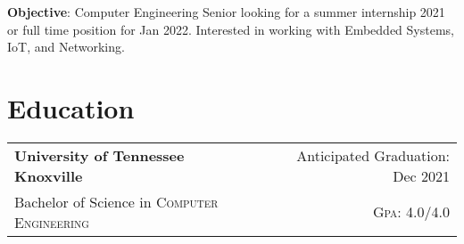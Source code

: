 \documentclass[a4paper,11pt]{article}
\begin{document}

\pagestyle{empty} %

\par{ \smallskip
\par{\textbf{Objective}: Computer Engineering Senior looking for a summer internship 2021 or full time position for Jan 2022.
Interested in working with Embedded Systems, IoT, and Networking.
}\smallskip}



\section{Education}
\begin{tabularx}{\textwidth}{lXr}
   \textbf{University of Tennessee Knoxville} & & Anticipated Graduation: Dec 2021\\
   Bachelor of Science in \textsc{Computer Engineering} &  & \normalsize \textsc{Gpa}: 4.0/4.0\\
\end{tabularx}
\end{document}
